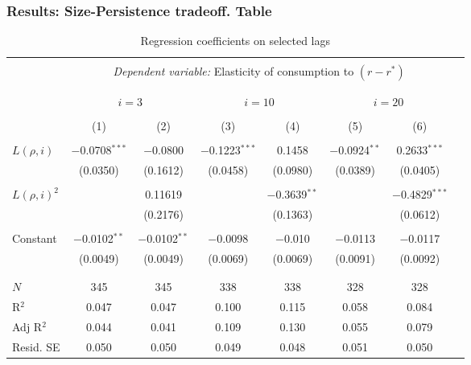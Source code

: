 \documentclass[11pt,pdf,aspectratio=129]{beamer}
\begin{document}
\begin{frame}\frametitle{Results: Size-Persistence tradeoff. Table}
    \begin{table}
        \centering
    \begin{threeparttable}
        \caption{Regression coefficients on selected lags} 
     \label{tab:SelectedLags} 
\tiny
   \begin{tabular}{@{\extracolsep{1pt}}lccccccc} 
       \\[-1.8ex]\hline 
       \hline \\[-1.8ex] 
        & \multicolumn{6}{c}{\textit{Dependent variable: }Elasticity of consumption to $\left(r-r^*\right)$} \\ \\[-1.8ex] \cline{2-7} \\[-1.8ex]
        &   \multicolumn{2}{c}{$i=3$}&\multicolumn{2}{c}{$i=10$}&\multicolumn{2}{c}{$i=20$}&
       \\  \cline{2-3} \cline{4-5} \cline{6-7} 
       \\[-1.8ex] & (1) & (2) & (3) & (4) & (5) & (6)  \\ 
       \hline \\[-1.8ex]  
       $L(\rho, i)$ & $-$0.0708$^{***}$ & $-$0.0800 &   $-$0.1223$^{***}$ & 0.1458   &    $-$0.0924$^{**}$ & 0.2633$^{***}$   \\ 
       & (0.0350) & (0.1612) & (0.0458) &  (0.0980) & (0.0389)  &(0.0405)  \\ 
       & & & & & &   \\ 
       $L(\rho, i)^2$  &  & 0.11619 &   & $-$0.3639$^{**}$ &   &$-$0.4829$^{***}$   \\ 
       &  & (0.2176) &   &  (0.1363)&  &(0.0612)  \\ 
       & & & & & &  \\ 
      Constant & $-$0.0102$^{**}$ & $-$0.0102$^{**}$ & $-$0.0098 & $-$0.010& $-$0.0113 & $-$0.0117\\ 
       & (0.0049) & (0.0049) &(0.0069) & (0.0069) & (0.0091) & (0.0092) \\ 
       & & & & & &   \\ 
       \hline \\[-1.8ex] 
       $N$ & 345 & 345 & 338 & 338 & 328 & 328\\ 
       R$^{2}$ & 0.047 & 0.047 & 0.100 & 0.115 & 0.058 & 0.084  \\ 
       Adj R$^{2}$ & 0.044 & 0.041 & 0.109 & 0.130 & 0.055 & 0.079   \\ 
       Resid. SE & 0.050 & 0.050 & 0.049 & 0.048  & 0.051 & 0.050  \\ 

\end{tabular}
\end{threeparttable}
\end{table}
\end{frame}
\end{document}
